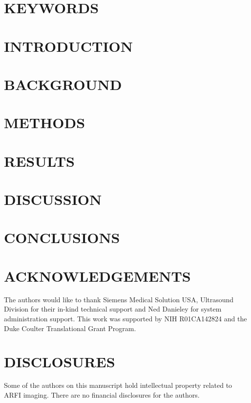 \documentclass[onecolumn,draftcls]{IEEEtran}
\begin{document}


\linenumbers



\section*{KEYWORDS}


\section{INTRODUCTION}\label{sect:intro}


\section{BACKGROUND}\label{sect:background}


\section{METHODS}\label{sect:methods}


\section{RESULTS}\label{sect:results}


\section{DISCUSSION}\label{sect:discussion}


\section{CONCLUSIONS}


\section*{ACKNOWLEDGEMENTS}
The authors would like to thank Siemens Medical Solution USA, Ultrasound
Division for their in-kind technical support and Ned Danieley for system administration support.
This work was supported by NIH R01CA142824 and the Duke Coulter Translational Grant Program.

\section*{DISCLOSURES}
Some of the authors on this manuscript hold intellectual property related to
ARFI imaging.  There are no financial disclosures for the authors.



\end{document}
